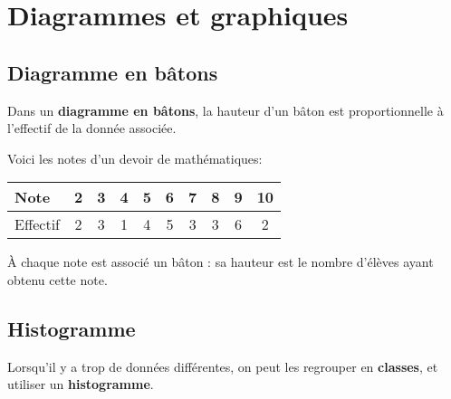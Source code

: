 \documentclass[../€Cours-complet/Cours-complet]{subfiles}
\begin{document}
\section{Diagrammes et graphiques}

\subsection{Diagramme en bâtons}

\begin{cours}
	Dans un \textbf{diagramme en bâtons}, la hauteur d'un bâton est proportionnelle à l'effectif de la donnée associée.
\end{cours}

\begin{exemple}
	Voici les notes d'un devoir de mathématiques:

	\begin{center}
		\begin{tabular}{|l|c|c|c|c|c|c|c|c|c|}
			\hline
			Note     & 2 & 3 & 4 & 5 & 6 & 7 & 8 & 9 & 10
			\\ \hline
			Effectif & 2 & 3 & 1 & 4 & 5 & 3 & 3 & 6 & 2
			\\ \hline
		\end{tabular}
	\end{center}

	À chaque note est associé un bâton : sa hauteur est le nombre d'élèves ayant obtenu cette note.

	\begin{center}
	\end{center}
\end{exemple}

\subsection{Histogramme}

\begin{cours}
	Lorsqu'il y a trop de données différentes, on peut les regrouper en \textbf{classes}, et utiliser un \textbf{histogramme}.
\end{cours}
\end{document}
